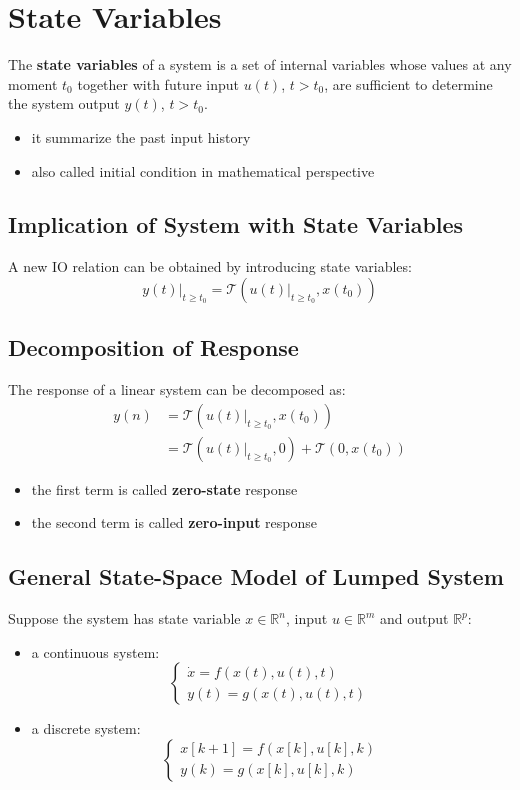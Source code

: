 \documentclass[10pt,a4paper,oneside]{article}
\begin{document}
\section{State Variables}
The \textbf{state variables} of a system is a set of internal variables whose values at any moment $t_0$ together with future input $u(t)$, $t>t_0$, are sufficient to determine the system output $y(t)$, $t>t_0$.
\begin{itemize}
	\item it summarize the past input history
	\item also called initial condition in mathematical perspective
\end{itemize}

\subsection{Implication of System with State Variables}
A new IO relation can be obtained by introducing state variables:
\[
y(t) | _{t \geq t_0} = \mathcal{T} \left(u(t) | _{t\geq t_0} , x(t_0)\right)
\]

\subsection{Decomposition of Response}
The response of a linear system can be decomposed as:
\begin{align*}
y(n) &= \mathcal{T} \left(u(t) | _{t\geq t_0} , x(t_0)\right)\\
&=\mathcal{T} \left(u(t) | _{t\geq t_0} , 0\right) +\mathcal{T} \left(0, x(t_0)\right)
\end{align*}
\begin{itemize}
	\item the first term is called \textbf{zero-state} response
	\item the second term is called \textbf{zero-input} response
\end{itemize}

\subsection{General State-Space Model of Lumped System}
Suppose the system has state variable $x \in \mathbb{R}^n$, input $u \in \mathbb{R}^m$ and output $\mathbb{R}^p$:
\begin{itemize}
	\item a continuous system:
	\[
	\left\{
	\begin{array}{ll}
	\dot{x}= f(x(t), u(t), t)\\
	y(t) = g(x(t), u(t), t)\
	\end{array}\right.
	\]
	\item a discrete system:
	\[
	\left\{
	\begin{array}{ll}
	x[k+1] = f(x[k], u[k], k)\\
	y(k) = g(x[k], u[k], k)\
	\end{array}\right.
	\]
\end{itemize}
\end{document}
